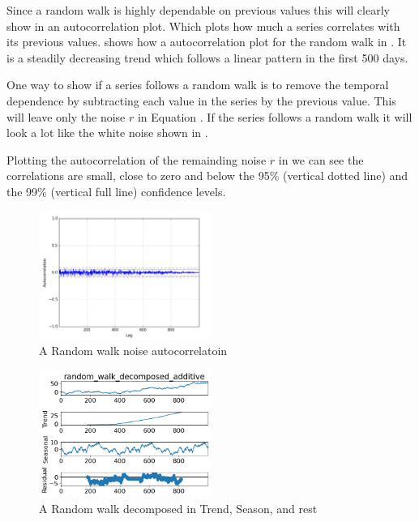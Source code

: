Since a random walk is highly dependable on previous values this will clearly show in an autocorrelation plot.
Which plots how much a series correlates with its previous values.
 shows how a autocorrelation plot for the random walk in .
It is a steadily decreasing trend which follows a linear pattern in the first 500 days.

One way to show if a series follows a random walk is to remove the temporal dependence by subtracting each value in the series by the previous value.
This will leave only the noise $r$ in Equation .
If the series follows a random walk it will look a lot like the white noise shown in .

Plotting the autocorrelation of the remainding noise $r$ in 
we can see the correlations are small, close to zero and below the 95\% (vertical dotted line) and the 99\% (vertical full line)
confidence levels.
\begin{figure}[H]
  \centering
  \includegraphics[width=0.5\textwidth]{./figs/illustrations/random_walk_noise_autocorrelation.png}
  \hfill
  \caption{A Random walk noise autocorrelatoin}
  \label{fig:dataset:random_walk_noise_autocorrelation}
\end{figure}
\begin{figure}[H]
  \centering
  \includegraphics[width=0.5\textwidth]{./figs/code_generated/data_exploration/random_walk_decomposed_additive.png}
  \hfill
  \caption{A Random walk decomposed in Trend, Season, and rest}
  \label{fig:dataset:random_walk_decomposed}
\end{figure}


